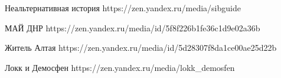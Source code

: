  
 
 
 
 

Неальтернативная история
https://zen.yandex.ru/media/sibguide

МАЙ ДНР
https://zen.yandex.ru/media/id/5f8f226b1fe36c1d9e02a36b

Житель Алтая
https://zen.yandex.ru/media/id/5d28307f8da1ce00ae25d22b

Локк и Демосфен
https://zen.yandex.ru/media/lokk_demosfen
